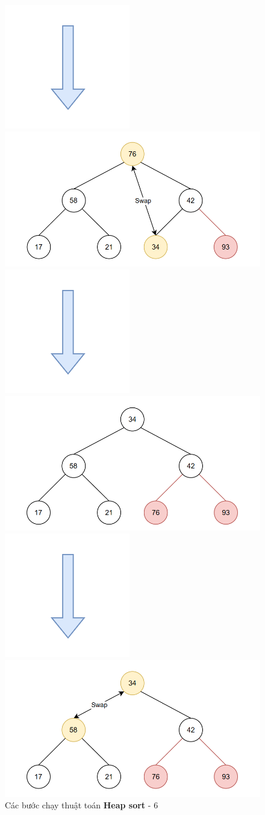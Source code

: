 \begin{figure}[H]
    \centering
    \includegraphics[width=0.1\linewidth]{img/heap_sort/arrow.png}
    \vspace{0.01cm}

    \includegraphics[width=0.5\linewidth]{img/heap_sort/13.png}
    \vspace{0.01cm}

    \includegraphics[width=0.1\linewidth]{img/heap_sort/arrow.png}
    \vspace{0.01cm}

    \includegraphics[width=0.5\linewidth]{img/heap_sort/14.png}
    \vspace{0.01cm}

    \includegraphics[width=0.1\linewidth]{img/heap_sort/arrow.png}
    \vspace{0.01cm}

    \includegraphics[width=0.5\linewidth]{img/heap_sort/15.png}

    \caption{Các bước chạy thuật toán \textbf{Heap sort} - 6}
\end{figure}

